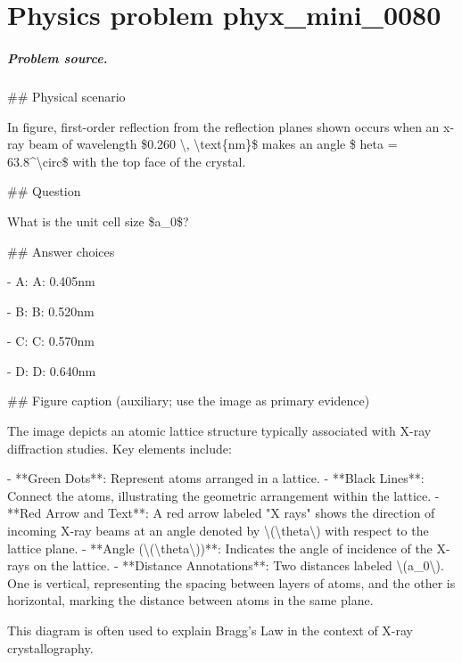 
\chapter{Physics problem phyx\_mini\_0080}
\label{ch:PhyXMiniProblems_problem_phyx_mini_0080}

\paragraph{Problem source.}
\#\# Physical scenario

In figure, first-order reflection from the reflection planes shown occurs when an x-ray beam of wavelength \$0.260 \textbackslash{}, \textbackslash{}text\{nm\}\$ makes an angle \$	heta = 63.8\textasciicircum{}\textbackslash{}circ\$ with the top face of the crystal.

\#\# Question

What is the unit cell size \$a\_0\$?

\#\# Answer choices

- A: A: 0.405nm

- B: B: 0.520nm

- C: C: 0.570nm

- D: D: 0.640nm

\#\# Figure caption (auxiliary; use the image as primary evidence)

The image depicts an atomic lattice structure typically associated with X-ray diffraction studies. Key elements include:

- **Green Dots**: Represent atoms arranged in a lattice.
- **Black Lines**: Connect the atoms, illustrating the geometric arrangement within the lattice.
- **Red Arrow and Text**: A red arrow labeled "X rays" shows the direction of incoming X-ray beams at an angle denoted by \textbackslash{}(\textbackslash{}theta\textbackslash{}) with respect to the lattice plane.
- **Angle (\textbackslash{}(\textbackslash{}theta\textbackslash{}))**: Indicates the angle of incidence of the X-rays on the lattice.
- **Distance Annotations**: Two distances labeled \textbackslash{}(a\_0\textbackslash{}). One is vertical, representing the spacing between layers of atoms, and the other is horizontal, marking the distance between atoms in the same plane.

This diagram is often used to explain Bragg's Law in the context of X-ray crystallography.

